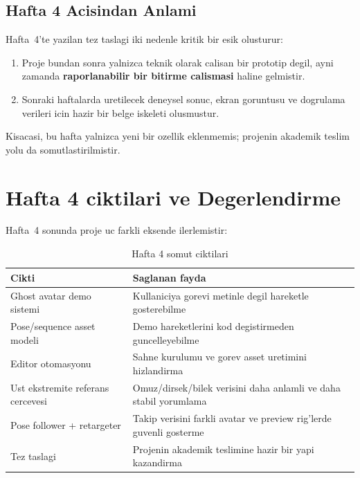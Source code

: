 \documentclass[11pt,a4paper]{article}
\begin{document}
\subsection{Hafta 4 Acisindan Anlami}

Hafta~4'te yazilan tez taslagi iki nedenle kritik bir esik olusturur:

\begin{enumerate}[nosep]
    \item Proje bundan sonra yalnizca teknik olarak calisan bir prototip degil,
          ayni zamanda \textbf{raporlanabilir bir bitirme calismasi} haline gelmistir.
    \item Sonraki haftalarda uretilecek deneysel sonuc, ekran goruntusu ve
          dogrulama verileri icin hazir bir belge iskeleti olusmustur.
\end{enumerate}

Kisacasi, bu hafta yalnizca yeni bir ozellik eklenmemis; projenin akademik
teslim yolu da somutlastirilmistir.

\section{Hafta 4 ciktilari ve Degerlendirme}
\label{sec:sonuc}

Hafta~4 sonunda proje uc farkli eksende ilerlemistir:

\begin{table}[H]
\centering
\caption{Hafta 4 somut ciktilari}
\label{tab:week4_outputs}
\renewcommand{\arraystretch}{1.22}
\begin{tabularx}{\textwidth}{lX}
\toprule
\textbf{Cikti} & \textbf{Saglanan fayda} \\
\midrule
Ghost avatar demo sistemi & Kullaniciya gorevi metinle degil hareketle gosterebilme \\
Pose/sequence asset modeli & Demo hareketlerini kod degistirmeden guncelleyebilme \\
Editor otomasyonu & Sahne kurulumu ve gorev asset uretimini hizlandirma \\
Ust ekstremite referans cercevesi & Omuz/dirsek/bilek verisini daha anlamli ve daha stabil yorumlama \\
Pose follower + retargeter & Takip verisini farkli avatar ve preview rig'lerde guvenli gosterme \\
Tez taslagi & Projenin akademik teslimine hazir bir yapi kazandirma \\
\bottomrule
\end{tabularx}
\end{table}
\end{document}
